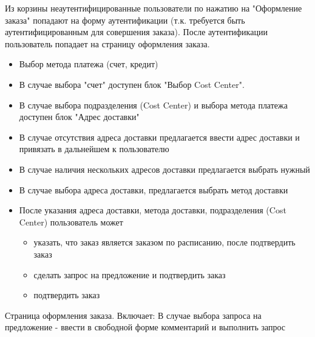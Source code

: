 {\begin{itogolong}
 Из корзины неаутентифицированные пользователи по нажатию на "Оформление заказа" попадают на форму аутентификации (т.к. требуется быть аутентифицированным для совершения заказа). После аутентификации пользователь попадает на страницу оформления заказа.
\begin{itemize}
\item Выбор метода платежа (счет, кредит)
\item В случае выбора "счет" доступен блок "Выбор Cost Center".
\item В случае выбора подразделения (Cost Center) и выбора метода платежа доступен блок "Адрес доставки"
\item В случае отсутствия адреса доставки предлагается ввести адрес доставки и привязать в дальнейшем к пользователю
\item В случае наличия нескольких адресов доставки предлагается выбрать нужный
\item В случае выбора адреса доставки, предлагается выбрать метод доставки
\item После указания адреса доставки, метода доставки, подразделения (Cost Center) пользователь может
\begin{itemize}
\item указать, что заказ является заказом по расписанию, после подтвердить заказ
\item сделать запрос на предложение и подтвердить заказ
\item подтвердить заказ
\end{itemize}
\end{itemize}
Страница оформления заказа. Включает:
В случае выбора запроса на предложение - ввести в свободной форме комментарий и выполнить запрос
\end{itogolong}



}
\ifcand
